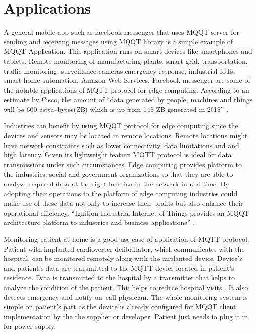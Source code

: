 \documentclass[sigconf]{acmart}
\begin{document}
\section{Applications}
A general mobile app such as facebook messenger that uses MQQT server for sending and receiving messages using MQQT library is a simple example of MQQT Application. This application runs on smart devices like smartphones and tablets.
Remote monitoring of manufacturing plants, smart grid, transportation, traffic monitoring, surveillance cameras,emergency response, industrial IoTs, smart home automation, Amazon Web Services, Facebook messenger are some of the notable  applications of MQTT protocol for edge computing. According to an estimate by Cisco, the amount of ``data generated by people, machines and things will be 600 zetta--bytes(ZB) which is up from 145 ZB generated in 2015'' \cite{www-rtinsights-com}. 

Industries can benefit by using MQQT protocol for edge computing since the devices and sensors may be located in remote locations. Remote locations might have network constraints such as lower connectivity, data limitations and and high latency. Given its lightweight feature MQTT protocol is ideal for data transmissions under such circumstances. Edge computing provides platform to the industries, social and government organizations so that they are able to analyze required data at the right location in the network in real time. By adopting their operations to the platform of edge computing industries could make use of these data not only to increase their profits but also enhance their operational efficiency. ``Ignition Industrial Internet of Things provides an MQQT architecture platform to industries and business applications'' \cite{inductiveautomation-com}. 

Monitoring patient at home is a good use case of application of MQTT protocol. Patient with implanted cardioverter defibrillator, which communicates with the hospital, can be monitored remotely along with the implanted device. Device's and patient's data are transmitted to the MQTT device located in patient's residence. Data is transmitted to the hospital by a transmitter that helps to analyze the condition of the patient. This helps to reduce hospital visits \cite{www-ibm-com/support}. It also detects emergency and notify on--call physician. The whole monitoring system is simple on patient's part as the device is already configured for MQQT client implementation by the the supplier or developer. Patient just needs to plug it in for power supply.
\end{document}
